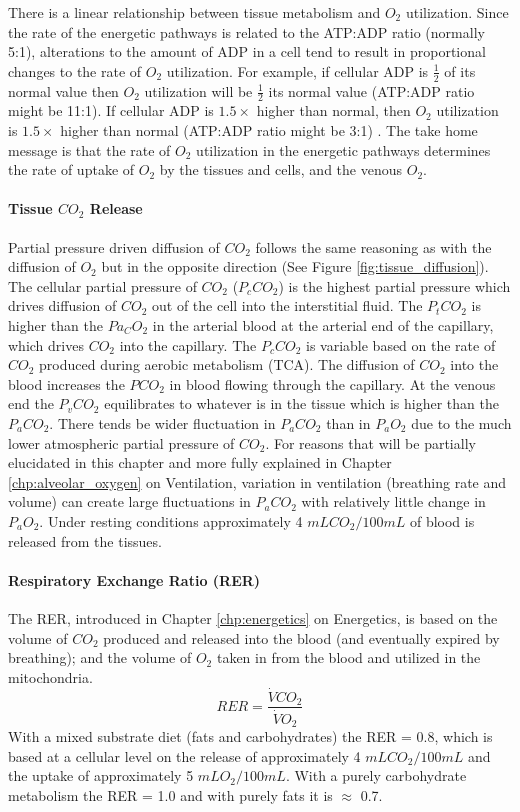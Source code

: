 There is a linear relationship between tissue metabolism and $O_2$ utilization. Since the rate of the energetic pathways is related to the ATP:ADP ratio (normally 5:1), alterations to the amount of ADP in a cell tend to result in proportional changes to the rate of $O_2$ utilization. For example, if cellular ADP is $\frac{1}{2}$ of its normal value then $O_2$ utilization will be $\frac{1}{2}$ its normal value (ATP:ADP ratio might be 11:1). If cellular ADP is $1.5 \times$ higher than normal, then $O_2$ utilization is $1.5 \times$ higher than normal (ATP:ADP ratio might be 3:1) \cite{hall_guyton_2020}. The take home message is that the rate of $O_2$ utilization in the energetic pathways determines the rate of uptake of $O_2$ by the tissues and cells, and the venous $O_2$. 

\paragraph{Tissue $CO_2$ Release}
Partial pressure driven diffusion of $CO_2$ follows the same reasoning as with the diffusion of $O_2$ but in the opposite direction (See Figure \ref{fig:tissue_diffusion}). The cellular partial pressure of $CO_2$ ($P_cCO_2$) is the highest partial pressure which drives diffusion of $CO_2$ out of the cell into the interstitial fluid. The $P_tCO_2$ is higher than the $Pa_CO_2$ in the arterial blood at the arterial end of the capillary, which drives $CO_2$ into the capillary. The $P_cCO_2$ is variable based on the rate of $CO_2$ produced during aerobic metabolism (TCA). The diffusion of $CO_2$ into the blood increases the $PCO_2$ in blood flowing through the capillary. At the venous end the $P_vCO_2$ equilibrates to whatever is in the tissue which is higher than the $P_aCO_2$. There tends be wider fluctuation in $P_aCO_2$ than in $P_aO_2$ due to the much lower atmospheric partial pressure of $CO_2$. For reasons that will be partially elucidated in this chapter and more fully explained in Chapter \ref{chp:alveolar_oxygen} on Ventilation, variation in ventilation (breathing rate and volume) can create large fluctuations in $P_aCO_2$ with relatively little change in $P_aO_2$. Under resting conditions approximately 4 $mL CO_2 / 100 mL$ of blood is released from the tissues. 

\paragraph{Respiratory Exchange Ratio (RER)}

The RER, introduced in Chapter \ref{chp:energetics} on Energetics, is based on the volume of $CO_2$ produced and released into the blood (and eventually expired by breathing); and the volume of $O_2$ taken in from the blood and utilized in the mitochondria. 
\begin{equation}
    RER = \frac{\dot{V}CO_2}{\dot{V}O_2}
\end{equation}
With a mixed substrate diet (fats and carbohydrates) the RER = 0.8, which is based at a cellular level on the release of approximately 4 $mL CO_2 / 100 mL$ and the uptake of approximately 5 $mL O_2 / 100 mL$. With a purely carbohydrate metabolism the RER = 1.0 and with purely fats it is $\approx$ 0.7. 


